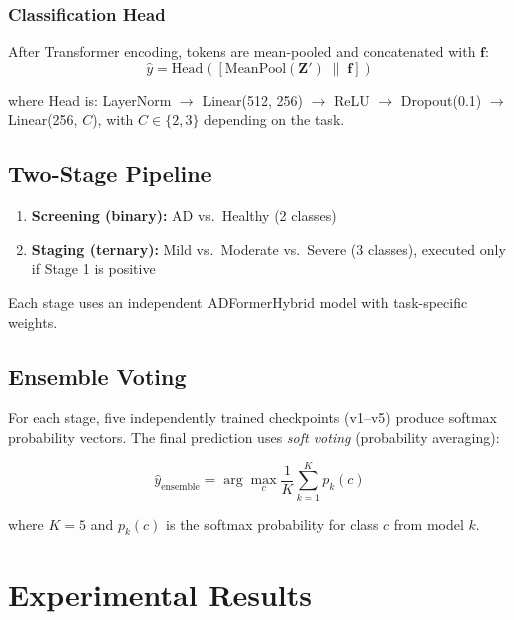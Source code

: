 \documentclass[twocolumn,11pt]{article}
\begin{document}
\subsubsection{Classification Head}

After Transformer encoding, tokens are mean-pooled and concatenated with $\mathbf{f}$:
\begin{equation}
  \hat{y} = \text{Head}\left(\left[\text{MeanPool}(\mathbf{Z}') \; \| \; \mathbf{f}\right]\right)
\end{equation}

where Head is: LayerNorm $\to$ Linear(512, 256) $\to$ ReLU $\to$ Dropout(0.1) $\to$ Linear(256, $C$), with $C \in \{2, 3\}$ depending on the task.

\subsection{Two-Stage Pipeline}

\begin{enumerate}[nosep]
  \item \textbf{Screening (binary):} AD vs.\ Healthy (2 classes)
  \item \textbf{Staging (ternary):} Mild vs.\ Moderate vs.\ Severe (3 classes), executed only if Stage 1 is positive
\end{enumerate}

Each stage uses an independent ADFormerHybrid model with task-specific weights.

\subsection{Ensemble Voting}

For each stage, five independently trained checkpoints (v1--v5) produce softmax probability vectors. The final prediction uses \textit{soft voting} (probability averaging):

\begin{equation}
  \hat{y}_{\text{ensemble}} = \arg\max_c \frac{1}{K} \sum_{k=1}^{K} p_k(c)
\end{equation}

where $K = 5$ and $p_k(c)$ is the softmax probability for class $c$ from model $k$.

\section{Experimental Results}
\end{document}
